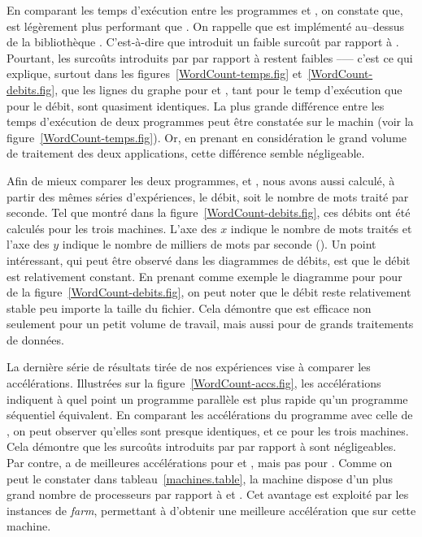 En comparant les temps d'ex\'ecution entre les programmes  et , on constate que,  est l\'eg\`erement plus performant que . On rappelle que  est impl\'ement\'e au–dessus de la biblioth\`eque . C'est-\`a-dire que  introduit un faible surco\^ut par rapport \`a . Pourtant, les surco\^uts introduits par  par rapport \`a  restent faibles --— c'est ce qui explique, surtout dans les figures~\ref{WordCount-temps.fig} et~\ref{WordCount-debits.fig}, que les lignes du graphe pour  et , tant pour le temp d'ex\'ecution que pour le d\'ebit, sont quasiment identiques. La plus grande diff\'erence entre les temps d'ex\'ecution de deux programmes peut \^etre constat\'ee sur le machin  (voir la figure~\ref{WordCount-temps.fig}). Or, en prenant en consid\'eration le grand volume de traitement des deux applications, cette diff\'erence semble n\'egligeable.

Afin de mieux comparer les deux programmes,  et , nous avons aussi calculé, à partir des mêmes séries d'exp\'eriences, le d\'ebit, soit le nombre de mots trait\'e par seconde. Tel que montr\'e dans la figure~\ref{WordCount-debits.fig}, ces débits ont \'et\'e calculés pour les trois machines. L'axe des $x$ indique le nombre de mots trait\'es et l'axe des $y$ indique le nombre de milliers de mots par seconde (). Un point int\'eressant, qui peut \^etre observ\'e dans les diagrammes de d\'ebits, est que le d\'ebit est relativement constant. En prenant comme exemple le diagramme pour  pour  de la figure~\ref{WordCount-debits.fig}, on peut noter que le d\'ebit reste relativement stable peu importe la taille du fichier. Cela d\'emontre que  est efficace non seulement pour un petit volume de travail, mais aussi pour de grands traitements de donn\'ees.




La derni\`ere s\'erie de résultats tirée de nos exp\'eriences vise \`a comparer les acc\'el\'erations. Illustr\'ees sur la figure~\ref{WordCount-accs.fig}, les acc\'el\'erations indiquent \`a quel point un programme parall\`ele est plus rapide qu'un programme s\'equentiel \'equivalent. En comparant les acc\'el\'erations du programme  avec celle de , on peut observer qu'elles sont presque identiques, et ce pour les trois machines. Cela d\'emontre que les surco\^uts introduits par  par rapport \`a  sont n\'egligeables. Par contre,  a de meilleures acc\'el\'erations pour  et , mais pas pour . Comme on peut le constater dans tableau~\ref{machines.table}, la machine  dispose d'un plus grand nombre de processeurs par rapport \`a  et . Cet avantage est exploit\'e par les instances de \emph{farm}, permettant \`a  d'obtenir une meilleure acc\'el\'eration que  sur cette machine.

